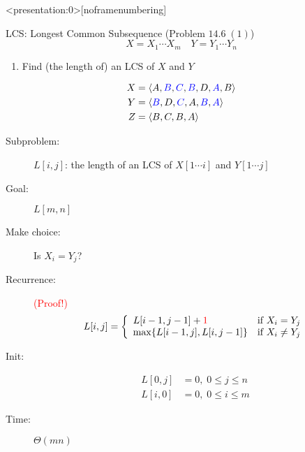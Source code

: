 
\begin{frame}<presentation:0>[noframenumbering]
  \centerline{}
\end{frame}

\begin{frame}
  \begin{exampleblock}{LCS: Longest Common Subsequence (Problem $14.6\; (1)$)}
    \[
      X = X_{1} \cdots X_{m} \quad Y = Y_{1} \cdots Y_{n}
    \]

    \begin{enumerate}[(1)]
      \item Find (the length of) an LCS of $X$ and $Y$
    \end{enumerate}
  \end{exampleblock}

  \begin{align*}
    X &= \langle A,\textcolor{blue}{B},\textcolor{blue}{C},\textcolor{blue}{B},D,\textcolor{blue}{A},B \rangle  \\
    Y &= \langle \textcolor{blue}{B},D,\textcolor{blue}{C},A,\textcolor{blue}{B},\textcolor{blue}{A} \rangle \\
    Z &= \langle B,C,B,A \rangle
  \end{align*}
\end{frame}
\begin{frame}{}
  \begin{description}
    \item[Subproblem:] $L[i,j]$: the length of an LCS of $X[1 \cdots i]$ and $Y[1 \cdots j]$
    \item[Goal:] $L[m,n]$
      \pause
    \item[Make choice:] Is $X_{i} = Y_{j}$?
    \item[Recurrence:] \textcolor{red}{(Proof!)}
      \begin{displaymath}
	L[i,j] = \left\{ \begin{array}{ll}
	  L[i-1, j-1] + \textcolor{red}{1} & \textrm{if $X_{i} = Y_{j}$}\\
	  \max \{L[i-1,j], L[i,j-1]\} & \textrm{if $X_{i} \neq Y_{j}$}
	\end{array} \right.
      \end{displaymath}
      \pause
    \item[Init:]
      \begin{align*}
	L[0,j] &= 0, \; 0 \le j \le n \\
	L[i,0] &= 0, \; 0 \le i \le m 
      \end{align*}
    \item[Time:] $\Theta(mn)$
  \end{description}
\end{frame}
